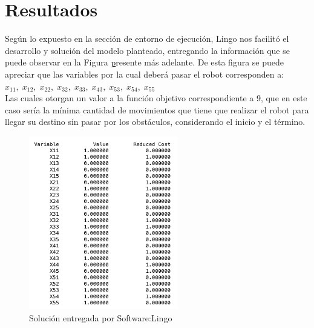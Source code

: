 \documentclass[journal, 10pt]{IEEEtran}
\begin{document}
\section{Resultados}
Según lo expuesto en la sección de entorno de ejecución, Lingo nos facilitó el desarrollo y solución del modelo planteado, entregando la información que se puede observar en la Figura \href{solucion-lingo} presente más adelante.
De esta figura se puede apreciar que las variables por la cual deberá pasar el robot corresponden a: ${x}_{11},\;{x}_{12},\;{x}_{22},\;{x}_{32},\;{x}_{33},\;{x}_{43},\;{x}_{53},\;{x}_{54},\;{x}_{55}\;$\\ 
Las cuales otorgan un valor a la función objetivo correspondiente a 9, que en este caso sería la mínima cantidad de movimientos que tiene que realizar el robot para llegar  su destino sin pasar por los obstáculos, considerando el inicio y el término.\\
\begin{figure}[H]
    \centering
    \includegraphics[width=6.5cm]{2.png}
    \caption{Solución entregada por Software:Lingo}
    \label{solucion-lingo}
\end{figure}
\end{document}
